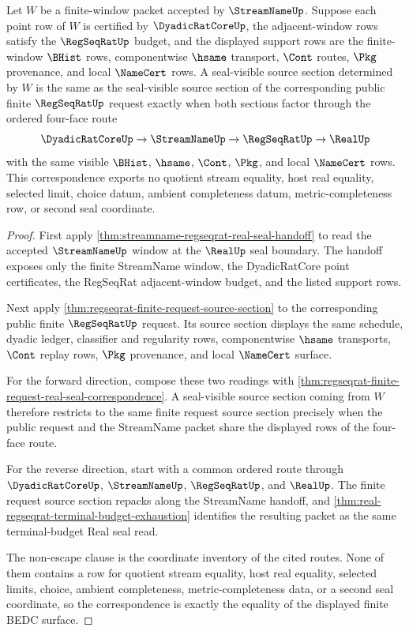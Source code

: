\begin{theorem}
\label{thm:streamname-regseqrat-real-seal-correspondence}
Let $W$ be a finite-window packet accepted by $\StreamNameUp$. Suppose each point row of $W$ is certified by $\DyadicRatCoreUp$, the adjacent-window rows satisfy the $\RegSeqRatUp$ budget, and the displayed support rows are the finite-window $\BHist$ rows, componentwise $\hsame$ transport, $\Cont$ routes, $\Pkg$ provenance, and local $\NameCert$ rows. A seal-visible source section determined by $W$ is the same as the seal-visible source section of the corresponding public finite $\RegSeqRatUp$ request exactly when both sections factor through the ordered four-face route
$$
\DyadicRatCoreUp \to \StreamNameUp \to \RegSeqRatUp \to \RealUp
$$
with the same visible $\BHist$, $\hsame$, $\Cont$, $\Pkg$, and local $\NameCert$ rows. This correspondence exports no quotient stream equality, host real equality, selected limit, choice datum, ambient completeness datum, metric-completeness row, or second seal coordinate.
\end{theorem}
\begin{proof}
First apply \autoref{thm:streamname-regseqrat-real-seal-handoff} to read the accepted $\StreamNameUp$ window at the $\RealUp$ seal boundary. The handoff exposes only the finite StreamName window, the DyadicRatCore point certificates, the RegSeqRat adjacent-window budget, and the listed support rows.

Next apply \autoref{thm:regseqrat-finite-request-source-section} to the corresponding public finite $\RegSeqRatUp$ request. Its source section displays the same schedule, dyadic ledger, classifier and regularity rows, componentwise $\hsame$ transports, $\Cont$ replay rows, $\Pkg$ provenance, and local $\NameCert$ surface.

For the forward direction, compose these two readings with \autoref{thm:regseqrat-finite-request-real-seal-correspondence}. A seal-visible source section coming from $W$ therefore restricts to the same finite request source section precisely when the public request and the StreamName packet share the displayed rows of the four-face route.

For the reverse direction, start with a common ordered route through $\DyadicRatCoreUp$, $\StreamNameUp$, $\RegSeqRatUp$, and $\RealUp$. The finite request source section repacks along the StreamName handoff, and \autoref{thm:real-regseqrat-terminal-budget-exhaustion} identifies the resulting packet as the same terminal-budget Real seal read.

The non-escape clause is the coordinate inventory of the cited routes. None of them contains a row for quotient stream equality, host real equality, selected limits, choice, ambient completeness, metric-completeness data, or a second seal coordinate, so the correspondence is exactly the equality of the displayed finite BEDC surface.
\end{proof}

